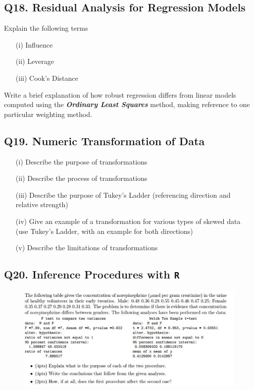 \documentclass[a4paper,12pt]{article}
\begin{document}
\subsection*{Q18. Residual Analysis for Regression Models} %
Explain the following terms
\begin{itemize}
\item[(i)]	Influence
\item[(ii)]	Leverage
\item[(iii)]	Cook’s Distance
\end{itemize}
Write a brief explanation of how robust regression differs from linear models computed using the \textbf{\textit{Ordinary Least Squares}} method, making reference to one particular weighting method.



\subsection*{Q19. Numeric Transformation of Data} %


\begin{itemize}
	\item[(i)] Describe the purpose of transformations
	\item[(ii)] Describe the process of transformations
	\item[(iii)] Describe the purpose of Tukey's Ladder (referencing direction and relative strength)
	\item[(iv)] Give an example of a transformation for various types of skewed data (use Tukey's Ladder, with an example for both directions)
	\item[(v)] Describe the limitations of transformations
\end{itemize}

\subsection*{Q20. Inference Procedures with \texttt{R}} %
\begin{figure}[h!]
\centering
\includegraphics[width=1.1\linewidth]{image/Q20REview}
\end{figure}
\newpage
\end{document}
